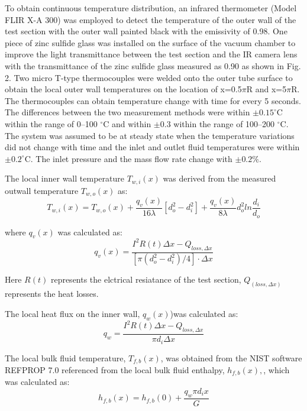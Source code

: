 \documentclass[a4paper,12pt]{article}
\begin{document}
To obtain continuous temperature distribution, an infrared thermometer (Model FLIR X-A 300) was employed to detect the temperature of the outer wall of the test section with the outer wall painted black with the emissivity of 0.98. One piece of zinc sulfide glass was installed on the surface of the vacuum chamber to improve the light transmittance between the test section and the IR camera lens with the transmittance of the zinc sulfide glass measured as 0.90 as shown in Fig. 2. 
Two micro T-type thermocouples were welded onto the outer tube surface to obtain the local outer wall temperatures on the location of x=0.5$\pi$R and x=5$\pi$R. The thermocouples can obtain temperature change with time for every 5 seconds. The differences between the two measurement methods were within $\pm0.15 ^{\circ}$C within the range of 0–100 $^{\circ}$C and within $\pm0.3$ within the range of 100–200 $^{\circ}$C. 
The system was assumed to be at steady state when the temperature variations did not change with time and the inlet and outlet fluid temperatures were within $\pm0.2 ^{\circ}$C.
The inlet pressure and the mass flow rate change with $\pm0.2\%$.


The local inner wall temperature $T_{w,i}(x)$ was derived from the measured outwall temperature $T_{w,o}(x)$ as:
\begin{equation}
T_{w,i}(x) = T_{w,o}(x)+\frac{q_v(x)}{16\lambda}[d_o^2-d_i^2]+\frac{q_v(x)}{8\lambda}d_o^2ln\frac{d_i}{d_o}
\end{equation}

where $q_v(x)$ was calculated as:
\begin{equation}
q_v(x)=\frac{I^2R(t)\Delta x-Q_{loss,\Delta x}}{[\pi(d_o^2-d_i^2)/4]\cdot\Delta x}
\end{equation}

Here $R(t)$ represents the elctrical resiatance of the test section, $Q_(loss,\Delta x)$ represents the heat losses.

The local heat flux on the inner wall, $q_w(x)$)was calculated as:
\begin{equation}
q_w=\frac{I^2R(t)\Delta x-Q_{loss,\Delta x}}{\pi d_i\Delta x}
\end{equation}

The local bulk fluid temperature, $T_{f,b}(x)$, was obtained from the NIST software REFPROP 7.0 referenced from the local bulk fluid enthalpy, $h_{f,b}(x),$, which was calculated as:
\begin{equation}
h_{f,b}(x) = h_{f,b}(0)+\frac{q_w\pi d_ix}{G}
\end{equation}
\end{document}
